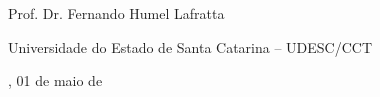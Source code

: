 \begin{folhadeaprovacao}
\begin{center}
		\vspace*{1.25cm}
		Prof. Dr. Fernando Humel Lafratta \par
		Universidade do Estado de Santa Catarina – UDESC/CCT
		
	
	\end{center}
    
    \vspace*{\fill}  
    \begin{center}
    {\imprimirlocal, 01 de maio de \imprimirdata}
	\end{center}
    \vspace*{0.25cm}  
\end{folhadeaprovacao}




%	
%	
%	
%	
